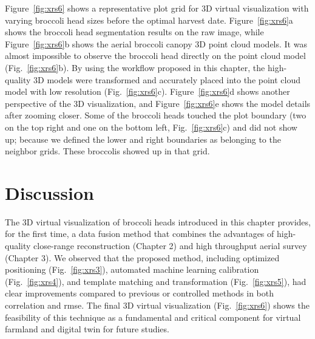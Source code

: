 Figure~\ref{fig:xrs6} shows a representative plot grid for 3D virtual visualization with varying broccoli head sizes before the optimal harvest date. Figure~\ref{fig:xrs6}a shows the broccoli head segmentation results on the raw image, while Figure~\ref{fig:xrs6}b shows the aerial broccoli canopy 3D point cloud models. It was almost impossible to observe the broccoli head directly on the point cloud model (Fig.~\ref{fig:xrs6}b). By using the workflow proposed in this chapter, the high-quality 3D models were transformed and accurately placed into the point cloud model with low resolution (Fig.~\ref{fig:xrs6}c). Figure~\ref{fig:xrs6}d shows another perspective of the 3D visualization, and Figure~\ref{fig:xrs6}e shows the model details after zooming closer. Some of the broccoli heads touched the plot boundary (two on the top right and one on the bottom left, Fig.~\ref{fig:xrs6}c) and did not show up; because we defined the lower and right boundaries as belonging to the neighbor grids. These broccolis showed up in that grid.



\section{Discussion}

The 3D virtual visualization of broccoli heads introduced in this chapter provides, for the first time, a data fusion method that combines the advantages of high-quality close-range reconstruction (Chapter 2) and high throughput aerial survey (Chapter 3). We observed that the proposed method, including optimized positioning (Fig.~\ref{fig:xrs3}), automated machine learning calibration (Fig.~\ref{fig:xrs4}), and template matching and transformation (Fig.~\ref{fig:xrs5}), had clear improvements compared to previous or controlled methods in both correlation and \gls{rmse}. The final 3D virtual visualization (Fig.~\ref{fig:xrs6}) shows the feasibility of this technique as a fundamental and critical component for virtual farmland and digital twin for future studies.

